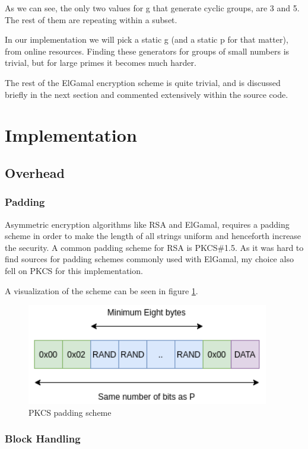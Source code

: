 \documentclass{article}
\begin{document}
As we can see, the only two values for g that generate cyclic groups, are 3 and 5. The rest of them are repeating within a subset.

In our implementation we will pick a static g (and a static p for that matter), from online resources. Finding these generators for groups of small numbers is trivial, but for large primes it becomes much harder.

The rest of the ElGamal encryption scheme is quite trivial, and is discussed briefly in the next section and commented extensively within the source code.
\section{Implementation}

\subsection{Overhead}

\subsubsection{Padding}
Asymmetric encryption algorithms like RSA and ElGamal, requires a padding scheme in order to make the length of all strings uniform and henceforth increase the security. A common padding scheme for RSA is PKCS\#1.5. As it was hard to find sources for padding schemes commonly used with ElGamal, my choice also fell on PKCS for this implementation.

A visualization of the scheme can be seen in figure \ref{rPKCS}.

\begin{figure}[H]
 \centering
  \includegraphics[width=300pt]{img/padding.png}
 \caption{PKCS padding scheme}
 \label{rPKCS}
 \end{figure}

\subsubsection{Block Handling}
\end{document}
